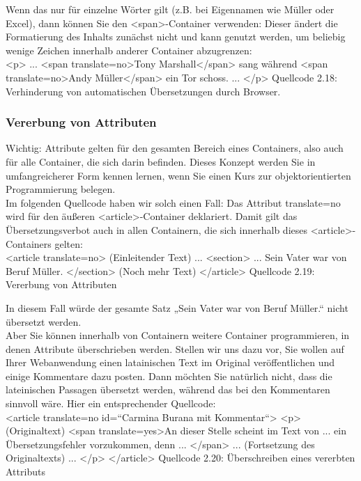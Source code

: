 Wenn das nur für einzelne Wörter gilt (z.B. bei Eigennamen wie Müller oder Excel), dann können Sie den <span>-Container verwenden: Dieser ändert die Formatierung des Inhalts zunächst nicht und kann genutzt werden, um beliebig wenige Zeichen innerhalb anderer Container abzugrenzen:\\

<p> 
... 
<span translate=no>Tony Marshall</span> sang während 
<span translate=no>Andy Müller</span> ein Tor schoss. 
...
</p>
Quellcode 2.18: Verhinderung von automatischen Übersetzungen durch Browser.

\subsubsection{Vererbung von Attributen}

Wichtig: Attribute gelten für den gesamten Bereich eines Containers, also auch für alle Container, die sich darin befinden. Dieses Konzept werden Sie in umfangreicherer Form kennen lernen, wenn Sie einen Kurs zur objektorientierten Programmierung belegen.\\

Im folgenden Quellcode haben wir solch einen Fall: Das Attribut translate=no wird für den äußeren <article>-Container deklariert. Damit gilt das Übersetzungsverbot auch in allen Containern, die sich innerhalb dieses <article>-Containers gelten:\\

<article translate=no>
(Einleitender Text) ...
<section> ... Sein Vater war von Beruf Müller.
</section>
(Noch mehr Text)
</article>
Quellcode 2.19: Vererbung von Attributen

In diesem Fall würde der gesamte Satz „Sein Vater war von Beruf Müller.“ nicht übersetzt werden.\\

Aber Sie können innerhalb von Containern weitere Container programmieren, in denen Attribute überschrieben werden. Stellen wir uns dazu vor, Sie wollen auf Ihrer Webanwendung einen latainischen Text im Original veröffentlichen und einige Kommentare dazu posten. Dann möchten Sie natürlich nicht, dass die lateinischen Passagen übersetzt werden, während das bei den Kommentaren sinnvoll wäre. Hier ein entsprechender Quellcode:\\

<article translate=no id=“Carmina Burana mit Kommentar“>
<p> (Originaltext) <span translate=yes>An dieser Stelle scheint im Text von ... ein Übersetzungsfehler vorzukommen, denn ... </span> ... (Fortsetzung des Originaltexts) ... </p>
</article>
Quellcode 2.20: Überschreiben eines vererbten Attributs

